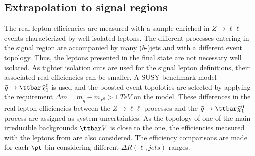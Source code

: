 
\subsection{Extrapolation to signal regions}
\label{subsec:app_RLE_extrapolation_to_signal_region}




































The real lepton efficiencies are measured with a sample enriched in $Z\to \ell\ell$ events characterized by well isolated leptons.
The different processes entering in the signal region are accompanied by many ($b$-)jets and with a different event topology.
Thus, the leptons presented in the final state are not necessary well isolated.
As tighter isolation cuts are used for the signal lepton definitions, their associated real efficiencies can be smaller.
A SUSY benchmark model $\tilde{g}\to\ttbar\tilde{\chi}^{0}_{1}$ is used and the boosted event topoloties are selected by applying the requirement $\Delta m=m_{\tilde{g}}-m_{\chi^{0}_{1}}>\SI{1}{TeV}$ on the model.
These differences in the real lepton efficiencies between the $Z\to \ell\ell$ processes and the $\tilde{g}\to\ttbar\tilde{\chi}^{0}_{1}$ process are assigned as system uncertainties.
As the topology of one of the main irreducible backgrounds $\ttbar V$ is close to the \ttbar one, the efficiencies measured with the leptons from \ttbar are also considered.
The efficiency comparisons are made for each $\pt$ bin considering different $\Delta R(\ell, jets)$ ranges.

